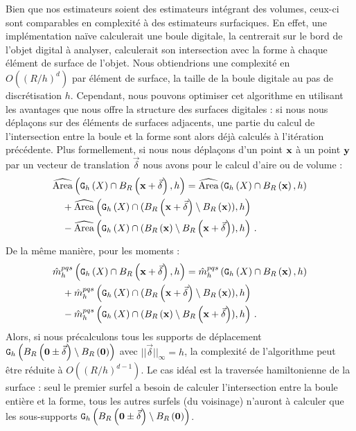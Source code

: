 Bien que nos estimateurs soient des estimateurs intégrant des volumes, ceux-ci
sont comparables en complexité à des estimateurs surfaciques. En effet, une
implémentation naïve calculerait une boule digitale, la centrerait sur le bord
de l'objet digital à analyser, calculerait son intersection avec la forme à
chaque élément de surface de l'objet. Nous obtiendrions une complexité en
$O((R/h)^{d})$ par élément de surface, \cad la taille de la boule digitale au
pas de discrétisation $h$. Cependant, nous pouvons optimiser cet algorithme en
utilisant les avantages que nous offre la structure des surfaces digitales : si
nous nous déplaçons sur des éléments de surfaces adjacents, une partie du calcul
de l'intersection entre la boule et la forme sont alors déjà calculés à
l'itération précédente. Plus formellement, si nous nous déplaçons d'un point
$\vx$ à un point $\vy$ par un vecteur de translation $\vec{\delta}$ %
nous avons pour le calcul d'aire ou de volume :
%
\begin{align}
  & \AreaC\left(\DSh \cap \Ball{R}{\vx + \vec{\delta}}, h\right) =
  \AreaC\left(\DSh \cap \Ball{R}{\vx}, h\right) \\
  &\quad + \AreaC\left(\DSh \cap (\Ball{R}{\vx + \vec{\delta}} \setminus \Ball{R}{\vx} ), h\right) \\
  &\quad - \AreaC\left(\DSh \cap ( \Ball{R}{\vx} \setminus \Ball{R}{\vx + \vec{\delta}}),h\right) \,.
\end{align}
%
De la même manière, pour les moments :
%
\begin{align}
  & \DMom{pqs}{h}\left(\DSh \cap \Ball{R}{\vx + \vec{\delta}}, h\right) =
  \DMom{pqs}{h}\left(\DSh \cap \Ball{R}{\vx}, h\right) \\
  &\quad + \DMom{pqs}{h}\left(\DSh \cap ( \Ball{R}{\vx+ \vec{\delta}} \setminus \Ball{R}{\vx} ), h\right)\\
  &\quad - \DMom{pqs}{h}\left(\DSh \cap ( \Ball{R}{\vx} \setminus \Ball{R}{\vx+ \vec{\delta}} ), h\right) \,.
\end{align}
%
Alors, si nous précalculons tous les supports de déplacement
$\DigF{\Ball{R}{\mathbf{0} \pm \vec{\delta}} \setminus
\Ball{R}{\mathbf{0}}}{h}$ avec $||\vec{\delta}||_\infty = h$, la complexité de l'algorithme peut être réduite à
$O((R/h)^{d-1})$. Le cas idéal est la traversée hamiltonienne de la surface :
seul le premier surfel a besoin de calculer l'intersection entre la boule
entière et la forme, tous les autres surfels (du voisinage) n'auront à calculer
que les sous-supports $\DigF{\Ball{R}{\mathbf{0} \pm \vec{\delta}} \setminus
\Ball{R}{\mathbf{0}}}{h}$.


